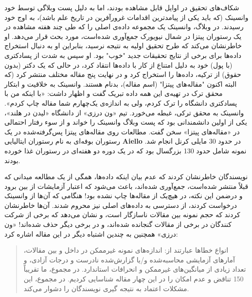 شکاف‌های تحقیق در اوایل قابل مشاهده بودند، اما به دلیل پست وبلاگی توسط خود وانسینک (که باید یکی از پیامدترین اقدامات غرورآفرین در تاریخ علم باشد)، به اوج خود رسیدند.
در وبلاگ، وانسینک یک مجموعه داده‌ی اصلی را که طی چند هفته مشاهده در یک رستوران پیتزا در شمال نیویورک جمع‌آوری شده‌است، مورد بحث قرار می‌دهد.
او خاطرنشان می‌کند که طرح تحقیق اولیه به نتیجه نرسید، بنابراین او به دنبال استخراج داده‌ها برای برخی از نتایج تحقیقات جدید "خوب" بود.
او سپس به شدت از پسادکتری (با پول) خود به دلیل امتناع از کار با داده‌ها انتقاد کرد، در حالی که یک دکتر (بدون حقوق) از ترکیه، داده‌ها را استخراج کرد و در نهایت پنج مقاله مختلف منتشر کرد (که البته اکنون "مقاله‌های پیتزا" (اسم مقاله)، بدنام هستند.
وانسینک به خلاقیت و ابتکار محقق ترک در تهیه‌ی این همه داده تبریک گفت و اظهار داشت: «با اینکه من با پسادکتری دانشگاه را ترک کردم، ولی به اندازه‌ی یک‌چهارم شما مقاله چاپ کردم».
وانسینک به محقق ترکی، غبطه می‌خورد.
تیم «ون درزی» از دانشگاه «لیدن در هلند»، یکی از اولین دانشمندانی بود که پست وبلاگ وانسینک را خواند و از سوء رفتار احتمالی در «مقاله‌های پیتزا» سخن گفت.
مطالعات روی مقاله‌های پیتزا پس‌گرفته‌شده در یک رستوران بوفه‌ای به نام رستوران ایتالیایی \textenglish{\textbf{Aiello}} در حدود 30 مایلی کرنل انجام شد.
نمونه شامل حدود 130 بزرگسال بود که در یک دوره دو هفته‌ای در رستوران غذا خورده بودند.

نویسندگان خاطرنشان کردند که عدم بیان اینکه داده‌ها، همگی از یک مطالعه میدانی که قبلاً منتشر شده‌است، جمع‌آوری شده‌اند، باعث می‌شود که اعتبار آزمایشات از بین برود و درضمن این نکته، در هیچ‌یک از مقاله‌ها چاپ نشده بود!
هنگامی که آن‌ها از وانسینک درخواست کردند، از دسترسی به داده‌های اصلی نیز محروم شدند.
آن‌ها خاطرنشان کردند که حجم نمونه بین مقالات ناسازگار است، و نشان می‌دهد که برخی از شرکت کنندگان در برخی از مقالات گنجانده شده‌اند، و در برخی دیگر حذف شده‌اند!
«ون درزی» همچنین به چندین اشتباه دیگر در این مقاله اشاره کرد:

\begin{quote}
    انواع خطاها عبارتند از: اندازه‌های نمونه غیرممکن در داخل و بین مقالات، آمارهای آزمایشی محاسبه‌شده و/یا گزارش‌شده نادرست و درجات آزادی، و تعداد زیادی از میانگین‌های غیرممکن و انحرافات استاندارد.
    در مجموع، ما تقریباً 150 تناقض و عدم امکان را در این چهار مقاله شناسایی کردیم.
    در مجموع، این مشکلات اعتماد به نتیجه گیری نویسندگان را دشوار می‌کند.
\end{quote}

